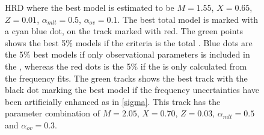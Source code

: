 \begin{figure}[htbp]
	\centering
	\caption{HRD where the best model is estimated to be $M=1.55$\msun, $X=0.65$, $Z=0.01$, $\alpha_{mlt} = 0.5$, $\alpha_{ov} = 0.1$. The best total model is marked with a cyan blue dot, on the track marked with red. The green points shows the best 5\% models if the criteria is the total \chis. Blue dots are the 5\% best models if only observational parameters is included in the \chis, whereas the red dots is the 5\% if the \chis is only calculated from the frequency fits. The green tracks shows the best track with the black dot marking the best model if the frequency uncertainties have been artificially enhanced as in \eqref{sigma}. This track has the parameter combination of $M =2.05$, $X = 0.70$, $Z=0.03$, $\alpha_{mlt}=0.5$ and $\alpha_{ov}=0.3$.}
	\label{hrd44taulenz}
\end{figure}
